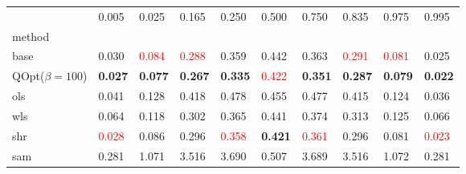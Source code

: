 \begin{tabular}{llllllllll}
\toprule
 & 0.005 & 0.025 & 0.165 & 0.250 & 0.500 & 0.750 & 0.835 & 0.975 & 0.995 \\
method &  &  &  &  &  &  &  &  &  \\
\midrule
base & 0.030 & \textcolor{red}{0.084} & \textcolor{red}{0.288} & 0.359 & 0.442 & 0.363 & \textcolor{red}{0.291} & \textcolor{red}{0.081} & 0.025 \\
\midrule
QOpt($\beta=100$) & \textbf{0.027} & \textbf{0.077} & \textbf{0.267} & \textbf{0.335} & \textcolor{red}{0.422} & \textbf{0.351} & \textbf{0.287} & \textbf{0.079} & \textbf{0.022} \\
ols & 0.041 & 0.128 & 0.418 & 0.478 & 0.455 & 0.477 & 0.415 & 0.124 & 0.036 \\
wls & 0.064 & 0.118 & 0.302 & 0.365 & 0.441 & 0.374 & 0.313 & 0.125 & 0.066 \\
shr & \textcolor{red}{0.028} & 0.086 & 0.296 & \textcolor{red}{0.358} & \textbf{0.421} & \textcolor{red}{0.361} & 0.296 & 0.081 & \textcolor{red}{0.023} \\
sam & 0.281 & 1.071 & 3.516 & 3.690 & 0.507 & 3.689 & 3.516 & 1.072 & 0.281 \\
\bottomrule
\end{tabular}